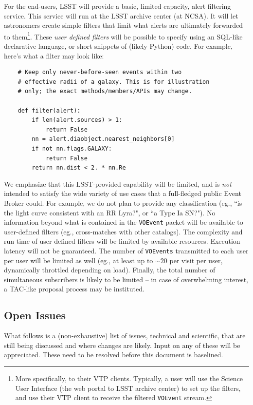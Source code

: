 \documentclass[12pt]{article}
\newcommand{\code}[1]{\texttt{#1}}
\newcommand{\VOEvent}{\code{VOEvent}\xspace}
\newcommand{\VOEvents}{\code{VOEvents}\xspace}
\begin{document}
For the end-users, LSST will provide a basic, limited capacity, alert filtering service. This service will run at the LSST archive center (at NCSA). It will let astronomers create simple filters that limit what alerts are ultimately forwarded to them\footnote{More specifically, to their VTP clients. Typically, a user will use the Science User Interface (the web portal to LSST archive center) to set up the filters, and use their VTP client to receive the filtered \VOEvent stream.}. These {\em user defined filters} will be possible to specify using an SQL-like declarative language, or short snippets of (likely Python) code. For example, here's what a filter may look like:
\begin{verbatim}
    # Keep only never-before-seen events within two
    # effective radii of a galaxy. This is for illustration 
    # only; the exact methods/members/APIs may change.
    
    def filter(alert):
        if len(alert.sources) > 1:
            return False
        nn = alert.diaobject.nearest_neighbors[0]
        if not nn.flags.GALAXY:
            return False
        return nn.dist < 2. * nn.Re
\end{verbatim}

We emphasize that this LSST-provided capability will be limited, and is {\em not} intended to satisfy the wide variety of use cases that a full-fledged public Event Broker could. For example, we do not plan to provide any classification (eg., ``is the light curve consistent with an RR Lyra?", or ``a Type Ia SN?"). No information beyond what is contained in the \VOEvent packet will be available to user-defined filters (eg., cross-matches with other catalogs). The complexity and run time of user defined filters will be limited by available resources. Execution latency will not be guaranteed. The number of \VOEvents transmitted to each user per user will be limited as well (eg., at least up to $\sim 20$ per visit per user, dynamically throttled depending on load). Finally, the total number of simultaneous subscribers is likely to be limited -- in case of overwhelming interest, a TAC-like proposal process may be instituted.

\subsection{Open Issues}

What follows is a (non-exhaustive) list of issues, technical and scientific, that are still being discussed and where changes are likely. Input on any of these will be appreciated. These need to be resolved before this document is baselined.
\end{document}
